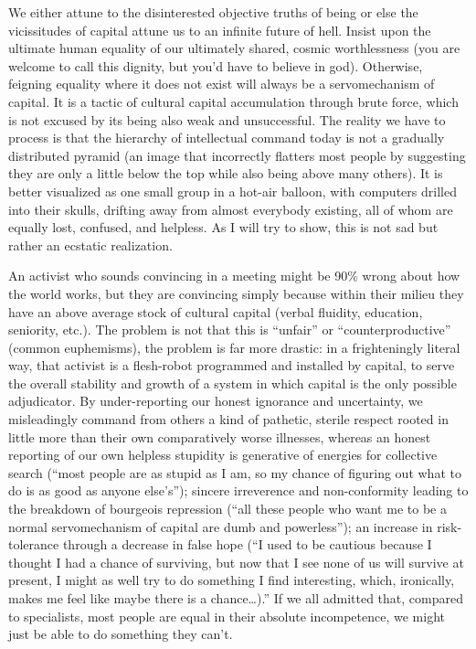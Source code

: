 \documentclass[a4paper,12pt,margin=.5in]{article}
\begin{document}
We either attune to the disinterested objective truths of being or else
the vicissitudes of capital attune us to an infinite future of hell.
Insist upon the ultimate human equality of our ultimately shared, cosmic
worthlessness (you are welcome to call this dignity, but you'd have to
believe in god). Otherwise, feigning equality where it does not exist
will always be a servomechanism of capital. It is a tactic of cultural
capital accumulation through brute force, which is not excused by its
being also weak and unsuccessful. The reality we have to process is that
the hierarchy of intellectual command today is not a gradually
distributed pyramid (an image that incorrectly flatters most people by
suggesting they are only a little below the top while also being above
many others). It is better visualized as one small group in a hot-air
balloon, with computers drilled into their skulls, drifting away from
almost everybody existing, all of whom are equally lost, confused, and
helpless. As I will try to show, this is not sad but rather an ecstatic
realization.

An activist who sounds convincing in a meeting might be 90\% wrong about
how the world works, but they are convincing simply because within their
milieu they have an above average stock of cultural capital (verbal
fluidity, education, seniority, etc.). The problem is not that this is
``unfair'' or ``counterproductive'' (common euphemisms), the problem is
far more drastic: in a frighteningly literal way, that activist is a
flesh-robot programmed and installed by capital, to serve the overall
stability and growth of a system in which capital is the only possible
adjudicator. By under-reporting our honest ignorance and uncertainty, we
misleadingly command from others a kind of pathetic, sterile respect
rooted in little more than their own comparatively worse illnesses,
whereas an honest reporting of our own helpless stupidity is generative
of energies for collective search (``most people are as stupid as I am,
so my chance of figuring out what to do is as good as anyone else's'');
sincere irreverence and non-conformity leading to the breakdown of
bourgeois repression (``all these people who want me to be a normal
servomechanism of capital are dumb and powerless''); an increase in
risk-tolerance through a decrease in false hope (``I used to be cautious
because I thought I had a chance of surviving, but now that I see none
of us will survive at present, I might as well try to do something I
find interesting, which, ironically, makes me feel like maybe there is a
chance\ldots{}).'' If we all admitted that, compared to specialists,
most people are equal in their absolute incompetence, we might just be
able to do something they can't.
\end{document}

